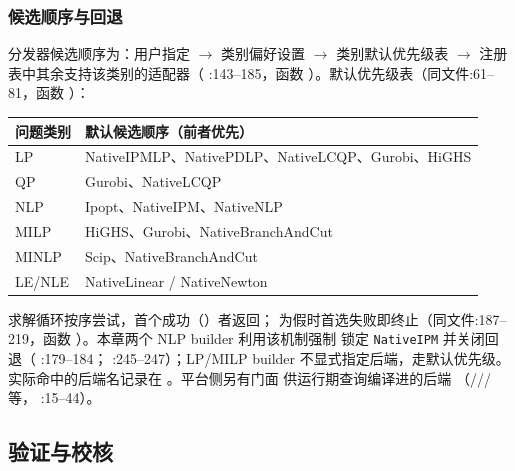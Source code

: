 \subsubsection*{候选顺序与回退}
分发器候选顺序为：用户指定  $\to$ 类别偏好设置 $\to$
类别默认优先级表 $\to$ 注册表中其余支持该类别的适配器（
:143--185，函数
）。默认优先级表（同文件:61--81，函数
）：
\begin{center}
\footnotesize
\begin{tabular}{ll}
\toprule
问题类别 & 默认候选顺序（前者优先）\\
\midrule
LP & NativeIPMLP、NativePDLP、NativeLCQP、Gurobi、HiGHS\\
QP & Gurobi、NativeLCQP\\
NLP & Ipopt、NativeIPM、NativeNLP\\
MILP & HiGHS、Gurobi、NativeBranchAndCut\\
MINLP & Scip、NativeBranchAndCut\\
LE/NLE & NativeLinear / NativeNewton\\
\bottomrule
\end{tabular}
\end{center}
求解循环按序尝试，首个成功（）者返回；
 为假时首选失败即终止（同文件:187--219，函数
）。本章两个 NLP builder 利用该机制强制
锁定 \texttt{NativeIPM} 并关闭回退（
:179--184；
:245--247）；LP/MILP builder
不显式指定后端，走默认优先级。实际命中的后端名记录在
。平台侧另有门面
 供运行期查询编译进的后端
（/// 等，
:15--44）。

\subsection{验证与校核}

